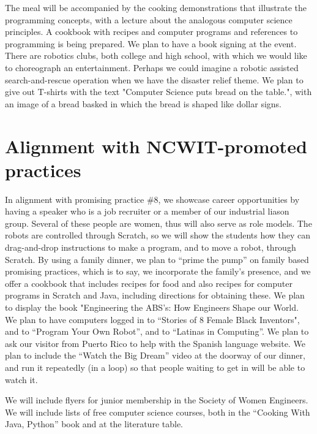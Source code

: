 \documentclass[]{article}
\begin{document}
The meal will be accompanied by the cooking demonstrations that illustrate the programming concepts, with a lecture about the 
analogous computer science principles. 
A cookbook with recipes and computer programs and references to programming is being prepared. We plan to have a book signing 
at the event.
There are robotics clubs, both college and high school, with which we would like to choreograph an entertainment. Perhaps we could 
imagine a robotic assisted search-and-rescue operation when we have the disaster relief theme. %
We plan to give out T-shirts with the text "Computer Science puts bread on the table.", with an image of a bread basked in which 
the bread is shaped like dollar signs.%


\section{Alignment with NCWIT-promoted practices}
In alignment with promising practice \#8, we showcase career opportunities by having a speaker who is a job recruiter or a member 
of our industrial liason group. Several of these people are women, thus will also serve as role models. The robots are controlled 
through Scratch, so we will show the students how they can drag-and-drop instructions to make a program, and to move a robot, 
through Scratch. 
By using a family dinner, we plan to ``prime the pump'' on family based promising practices, which is to say, we incorporate the 
family's presence, and we offer a cookbook that includes recipes for food and also recipes for computer programs in Scratch and 
Java, including directions for obtaining these. 
We plan to display the book "Engineering the ABS's: How Engineers Shape our World.
We plan to have computers logged in to  ``Stories of 8 Female Black Inventors", and to ``Program Your Own Robot'', and to 
``Latinas in Computing''. We plan to ask our visitor from Puerto Rico to help with the Spanish language website. 
We plan to include the ``Watch the Big Dream'' video at the doorway of our dinner, and run it repeatedly (in a loop) so that people
 waiting to get in will be able to watch it.

We will include flyers for junior membership in the Society of Women Engineers. We will include lists of free computer science 
courses, both in the ``Cooking With Java, Python'' book and at the literature table.
\end{document}
